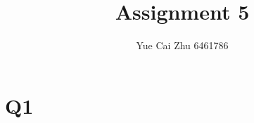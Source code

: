 \documentclass[]{article}
\title{Assignment 5}
\author{Yue Cai Zhu 6461786}
\begin{document}
\maketitle


\section{Q1}
\end{document}
